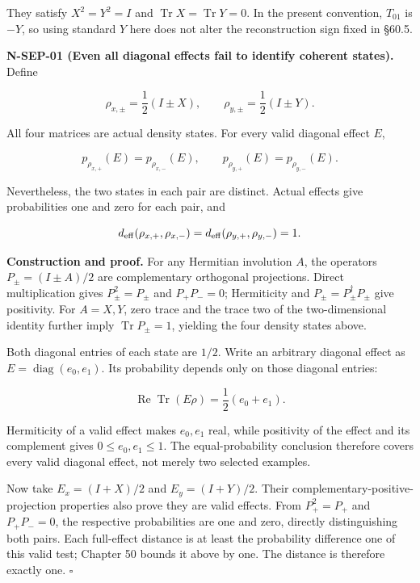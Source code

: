 \documentclass[
  11pt,
  oneside]{book}
\begin{document}
They satisfy \(X^2=Y^2=I\) and
\(\operatorname{Tr}X=\operatorname{Tr}Y=0\). In the present convention,
\(T_{01}\) is \(-Y\), so using standard \(Y\) here does not alter the
reconstruction sign fixed in §60.5.

\label{n-sep-01}{}

\textbf{N-SEP-01 (Even all diagonal effects fail to identify coherent
states).} Define

\[
\rho_{x,\pm}=\frac12(I\pm X),\qquad
\rho_{y,\pm}=\frac12(I\pm Y).
\]

All four matrices are actual density states. For every valid diagonal
effect \(E\),

\[
p_{\rho_{x,+}}(E)=p_{\rho_{x,-}}(E),\qquad
p_{\rho_{y,+}}(E)=p_{\rho_{y,-}}(E).
\]

Nevertheless, the two states in each pair are distinct. Actual effects
give probabilities one and zero for each pair, and

\[
d_{\rm eff}(\rho_{x,+},\rho_{x,-})
=d_{\rm eff}(\rho_{y,+},\rho_{y,-})=1.
\]

\textbf{Construction and proof.} For any Hermitian involution \(A\), the
operators \(P_\pm=(I\pm A)/2\) are complementary orthogonal projections.
Direct multiplication gives \(P_\pm^2=P_\pm\) and \(P_+P_-=0\);
Hermiticity and \(P_\pm=P_\pm^\dagger P_\pm\) give positivity. For
\(A=X,Y\), zero trace and the trace two of the two-dimensional identity
further imply \(\operatorname{Tr}P_\pm=1\), yielding the four density
states above.

Both diagonal entries of each state are \(1/2\). Write an arbitrary
diagonal effect as \(E=\operatorname{diag}(e_0,e_1)\). Its probability
depends only on those diagonal entries:

\[
\operatorname{Re}\operatorname{Tr}(E\rho)
=\frac12(e_0+e_1).
\]

Hermiticity of a valid effect makes \(e_0,e_1\) real, while positivity
of the effect and its complement gives \(0\le e_0,e_1\le1\). The
equal-probability conclusion therefore covers every valid diagonal
effect, not merely two selected examples.

Now take \(E_x=(I+X)/2\) and \(E_y=(I+Y)/2\). Their
complementary-positive-projection properties also prove they are valid
effects. From \(P_+^2=P_+\) and \(P_+P_-=0\), the respective
probabilities are one and zero, directly distinguishing both pairs. Each
full-effect distance is at least the probability difference one of this
valid test; Chapter 50 bounds it above by one. The distance is therefore
exactly one. \(\square\)
\end{document}
